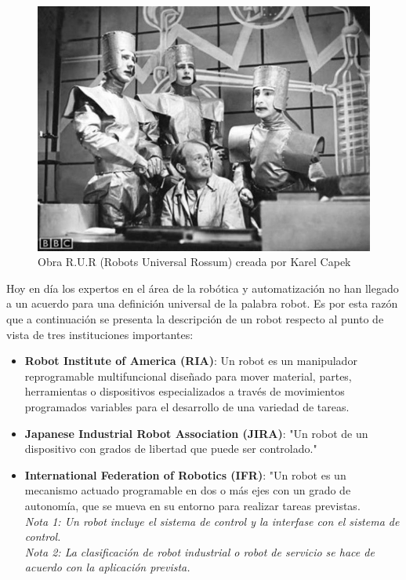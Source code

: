     \begin{figure}[htb]
        \centering
        \includegraphics[width=0.6\linewidth]{Main/Chapter2/Images2/Obra-robots.jpg}
        \caption{Obra R.U.R (Robots Universal Rossum) creada por Karel Capek}
        \label{f:Cap2_general_2}
    \end{figure}
    
    Hoy en día los expertos en el área de la robótica y automatización no han llegado a un acuerdo para una definición universal de la palabra robot. Es por esta razón que a continuación se presenta la descripción de un robot respecto al punto de vista de tres instituciones importantes:
    
    \begin{itemize}
    
        \item \textbf{Robot Institute of America (RIA)}: Un robot es un manipulador reprogramable multifuncional diseñado para mover material, partes, herramientas o dispositivos especializados a través de movimientos programados variables para el desarrollo de una variedad de tareas.
        
        \item \textbf{Japanese Industrial Robot Association (JIRA)}: "Un robot de un dispositivo con grados de libertad que puede ser controlado."
        
        \item \textbf{International Federation of Robotics (IFR)}: "Un robot es un mecanismo actuado programable en dos o más ejes con un grado de autonomía, que se mueva en su entorno para realizar tareas previstas.\\
        \textit{Nota 1: Un robot incluye el sistema de control y la interfase con el sistema de control.}\\
        \textit{Nota 2: La clasificación de robot industrial o robot de servicio se hace de acuerdo con la aplicación prevista.}
        
    \end{itemize}
    

